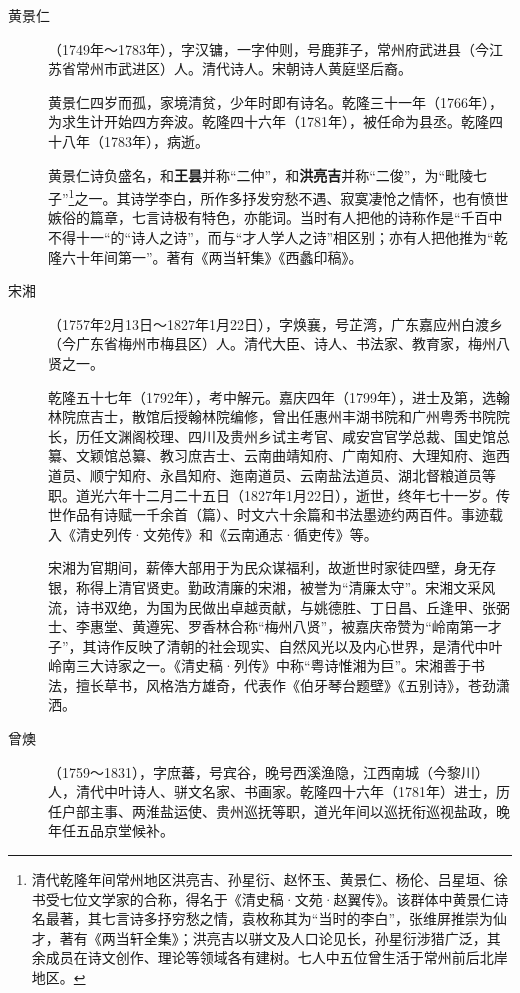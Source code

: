 \begin{description}
  \item[黄景仁] （1749年～1783年），字汉镛，一字仲则，号鹿菲子，常州府武进县（今江苏省常州市武进区）人。清代诗人。宋朝诗人黄庭坚后裔。\par
        黄景仁四岁而孤，家境清贫，少年时即有诗名。乾隆三十一年（1766年），为求生计开始四方奔波。乾隆四十六年（1781年），被任命为县丞。乾隆四十八年（1783年），病逝。\par
        黄景仁诗负盛名，和\textbf{王昙}并称“二仲”，和\textbf{洪亮吉}并称“二俊”，为“毗陵七子”\footnote{清代乾隆年间常州地区洪亮吉、孙星衍、赵怀玉、黄景仁、杨伦、吕星垣、徐书受七位文学家的合称，得名于《清史稿·文苑·赵翼传》。该群体中黄景仁诗名最著，其七言诗多抒穷愁之情，袁枚称其为“当时的李白”，张维屏推崇为仙才，著有《两当轩全集》；洪亮吉以骈文及人口论见长，孙星衍涉猎广泛，其余成员在诗文创作、理论等领域各有建树。七人中五位曾生活于常州前后北岸地区。}之一。其诗学李白，所作多抒发穷愁不遇、寂寞凄怆之情怀，也有愤世嫉俗的篇章，七言诗极有特色，亦能词。当时有人把他的诗称作是“千百中不得十一“的“诗人之诗”，而与“才人学人之诗”相区别；亦有人把他推为“乾隆六十年间第一”。著有《两当轩集》《西蠡印稿》。
  \item[宋湘] （1757年2月13日～1827年1月22日），字焕襄，号芷湾，广东嘉应州白渡乡（今广东省梅州市梅县区）人。清代大臣、诗人、书法家、教育家，梅州八贤之一。\par
        乾隆五十七年（1792年），考中解元。嘉庆四年（1799年），进士及第，选翰林院庶吉士，散馆后授翰林院编修，曾出任惠州丰湖书院和广州粤秀书院院长，历任文渊阁校理、四川及贵州乡试主考官、咸安宫官学总裁、国史馆总纂、文颖馆总纂、教习庶吉士、云南曲靖知府、广南知府、大理知府、迤西道员、顺宁知府、永昌知府、迤南道员、云南盐法道员、湖北督粮道员等职。道光六年十二月二十五日（1827年1月22日），逝世，终年七十一岁。传世作品有诗赋一千余首（篇）、时文六十余篇和书法墨迹约两百件。事迹载入《清史列传·文苑传》和《云南通志·循吏传》等。\par
        宋湘为官期间，薪俸大部用于为民众谋福利，故逝世时家徒四壁，身无存银，称得上清官贤吏。勤政清廉的宋湘，被誉为“清廉太守”。宋湘文采风流，诗书双绝，为国为民做出卓越贡献，与姚德胜、丁日昌、丘逢甲、张弼士、李惠堂、黄遵宪、罗香林合称“梅州八贤”，被嘉庆帝赞为“岭南第一才子”，其诗作反映了清朝的社会现实、自然风光以及内心世界，是清代中叶岭南三大诗家之一。《清史稿·列传》中称“粤诗惟湘为巨”。宋湘善于书法，擅长草书，风格浩方雄奇，代表作《伯牙琴台题壁》《五别诗》，苍劲潇洒。
  \item[曾燠] （1759～1831），字庶蕃，号宾谷，晚号西溪渔隐，江西南城（今黎川）人，清代中叶诗人、骈文名家、书画家。乾隆四十六年（1781年）进士，历任户部主事、两淮盐运使、贵州巡抚等职，道光年间以巡抚衔巡视盐政，晚年任五品京堂候补。\par

\end{description}
